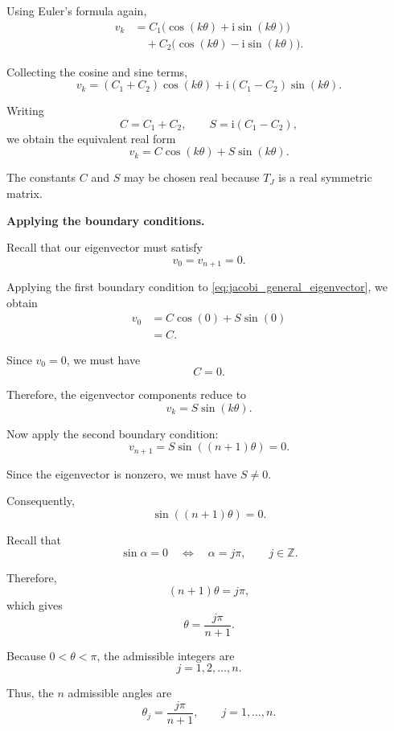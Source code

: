 \documentclass[11pt,a4paper]{article}
\theoremstyle{definition}
\theoremstyle{remark}
\begin{document}
Using Euler's formula again,
\[
\begin{aligned}
    v_k
    &=
    C_1\bigl(
        \cos(k\theta)
        +\mathrm{i}\sin(k\theta)
    \bigr)\\
    &\quad+
    C_2\bigl(
        \cos(k\theta)
        -\mathrm{i}\sin(k\theta)
    \bigr).
\end{aligned}
\]

Collecting the cosine and sine terms,
\[
    v_k=
    (C_1+C_2)\cos(k\theta)
    +
    \mathrm{i}(C_1-C_2)\sin(k\theta).
\]

Writing
\[
    C=C_1+C_2,
    \qquad
    S=\mathrm{i}(C_1-C_2),
\]
we obtain the equivalent real form
\begin{equation}
    \boxed{
    v_k=C\cos(k\theta)+S\sin(k\theta).
    }
    \label{eq:jacobi_general_eigenvector}
\end{equation}

The constants $C$ and $S$ may be
chosen real because $T_J$ is a
real symmetric matrix.

\medskip
\noindent
\textbf{Applying the boundary conditions.}

Recall that our eigenvector must satisfy
\[
    v_0=v_{n+1}=0.
\]

Applying the first boundary condition
to \eqref{eq:jacobi_general_eigenvector},
we obtain
\[
\begin{aligned}
    v_0
    &=C\cos(0)+S\sin(0)\\
    &=C.
\end{aligned}
\]

Since $v_0=0$, we must have
\[
    C=0.
\]

Therefore, the eigenvector components
reduce to
\[
    v_k=S\sin(k\theta).
\]

Now apply the second boundary condition:
\[
    v_{n+1}
    =
    S\sin((n+1)\theta)=0.
\]

Since the eigenvector is nonzero,
we must have $S\neq0$.

Consequently,
\[
    \sin((n+1)\theta)=0.
\]

Recall that
\[
    \sin\alpha=0
    \quad\Longleftrightarrow\quad
    \alpha=j\pi,
    \qquad j\in\mathbb{Z}.
\]

Therefore,
\[
    (n+1)\theta=j\pi,
\]
which gives
\[
    \theta=\frac{j\pi}{n+1}.
\]

Because $0<\theta<\pi$, the admissible
integers are
\[
    j=1,2,\ldots,n.
\]

Thus, the $n$ admissible angles are
\begin{equation}
    \boxed{
    \theta_j=\frac{j\pi}{n+1},
    \qquad j=1,\ldots,n.
    }
\end{equation}
\end{document}
